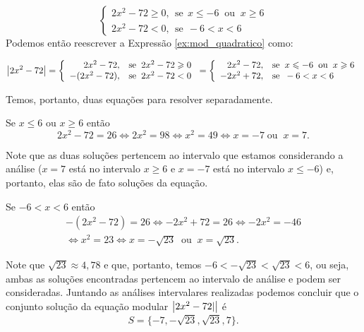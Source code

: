 \begin{exem}
     \[
     \begin{cases}
      2x^2- 72 \geq 0, \ \ \text{se} \ \ x \leq -6 \; \; \mbox{ou} \; \; x \geq 6\\
      2x^2- 72 < 0, \ \ \text{se} \ \ -6 < x < 6
      \end{cases}
     \]
Podemos então reescrever a Expressão \ref{ex:mod_quadratico} como:

\begin{equation}
\left|2x^2 - 72\right| = \left\{\begin{array}{rl}
2x^2 - 72, & \mbox{se} \; \;  2x^2 - 72 \geqslant 0\\
-(2x^2 - 72), & \mbox{se} \; \; 2x^2 - 72 < 0
\end{array}\right. = \left\{\begin{array}{rl}
2x^2 - 72, & \mbox{se} \; \;  x \leqslant -6 \; \; \mbox{ou} \; \; x \geqslant 6\\
-2x^2 + 72, & \mbox{se} \; \; -6 < x < 6
\end{array}\right. \end{equation}

Temos, portanto, duas equações para resolver separadamente.

Se $x\leq 6$ ou $x \geq 6$ então
\begin{equation*}
2x^2- 72= 26 \Leftrightarrow 2x^2= 98 \Leftrightarrow x^2= 49 \Leftrightarrow x= - 7\; \mbox{ou} \; \; x = 7.
\end{equation*}

     Note que as duas soluções pertencem ao intervalo que estamos considerando a análise ($x = 7$ está no intervalo $x \geq 6$ e $x = -7$ está no intervalo $x\leq -6$) e, portanto, elas são de fato soluções da equação.

Se $-6 < x < 6$ então
      \begin{eqnarray*}
      -(2x^2-72)= 26 \Leftrightarrow -2x^2 + 72= 26 \Leftrightarrow -2x^2= -46 \\
     \Leftrightarrow x^2= 23 \Leftrightarrow x= -\sqrt{23} \; \; \mbox{ou} \; \;  x = \sqrt{23}.
      \end{eqnarray*}

Note que $\sqrt{23} \approx 4,78$ e que, portanto, temos $-6 < -\sqrt{23} < \sqrt{23} < 6$, ou seja, ambas as soluções encontradas pertencem ao intervalo de análise e podem ser consideradas. Juntando as análises intervalares realizadas podemos concluir que o conjunto solução da equação modular $\left|2x^2 - 72|\right|$ é 
\begin{equation*}
S= \{-7, -\sqrt{23}, \sqrt{23}, 7\}.
\end{equation*}
\end{exem}

